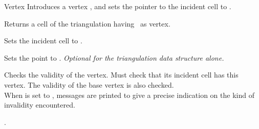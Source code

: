 \begin{ccRefConcept}[TriangulationDataStructure_3::]{Vertex}
{Introduces a vertex \ccVar, and sets the pointer to the incident cell
to .}


\ccOperations

\ccAccessFunctions

{Returns a cell of the triangulation having \ccVar\ as vertex.}


{Sets the incident cell to .}

{Sets the point to . {\textit{Optional for the
triangulation data structure alone.}}}

\begin{ccAdvanced}

{Checks the validity of the vertex. Must check that its incident cell
has this vertex. The validity of the base vertex is also checked.\\
When  is set to , messages are printed to give
a precise indication on the kind of invalidity encountered.}
\end{ccAdvanced}



\ccSeeAlso

.



\end{ccRefConcept}


